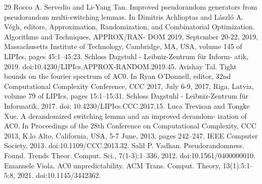 \documentclass[10pt,a4paper]{article}
\begin{document}
\begin{thebibliography}{29}
 Rocco A. Servedio and Li-Yang Tan. Improved pseudorandom generators from pseudorandom multi-switching lemmas. In Dimitris Achlioptas and László A. Végh, editors, Approximation, Randomization, and Combinatorial Optimization. Algorithms and Techniques, APPROX/RAN- DOM 2019, September 20-22, 2019, Massachusetts Institute of Technology, Cambridge, MA, USA, volume 145 of LIPIcs, pages 45:1–45:23. Schloss Dagstuhl - Leibniz-Zentrum für Inform- atik, 2019. doi:10.4230/LIPIcs.APPROX-RANDOM.2019.45.
 Avishay Tal. Tight bounds on the fourier spectrum of AC0. In Ryan O’Donnell, editor, 32nd Computational Complexity Conference, CCC 2017, July 6-9, 2017, Riga, Latvia, volume 79 of LIPIcs, pages 15:1–15:31. Schloss Dagstuhl - Leibniz-Zentrum für Informatik, 2017. doi: 10.4230/LIPIcs.CCC.2017.15.
 Luca Trevisan and Tongke Xue. A derandomized switching lemma and an improved derandom- ization of AC0. In Proceedings of the 28th Conference on Computational Complexity, CCC 2013, K.lo Alto, California, USA, 5-7 June, 2013, pages 242–247. IEEE Computer Society, 2013. doi:10.1109/CCC.2013.32.
 Salil P. Vadhan. Pseudorandomness. Found. Trends Theor. Comput. Sci., 7(1-3):1–336, 2012. doi:10.1561/0400000010.
 Emanuele Viola. AC0 unpredictability. ACM Trans. Comput. Theory, 13(1):5:1–5:8, 2021. doi:10.1145/3442362.
\end{thebibliography}
\end{document}
